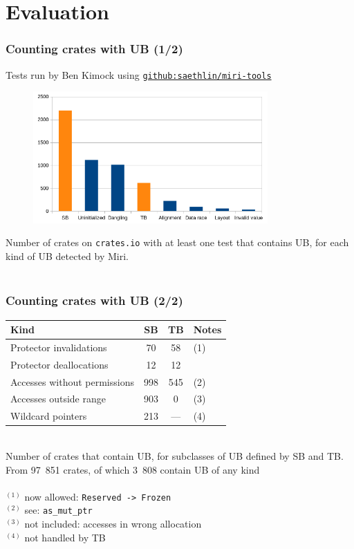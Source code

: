 \section{Evaluation}

\begin{frame}
    \frametitle{Counting crates with UB (1/2)}
    {\footnotesize
    Tests run by Ben Kimock using \href{https://github.com/saethlin/miri-tools}{\texttt{github:saethlin/miri-tools}}\\
    }
    \begin{figure}
        \includegraphics[width=0.8\textwidth]{../img/ub-count.png}
    \end{figure}
    {\footnotesize Number of crates on \texttt{crates.io} with at least one test
    that contains UB, for each kind of UB detected by Miri.}\\~\\
\end{frame}

\begin{frame}
    \frametitle{Counting crates with UB (2/2)}
    \begin{tabular}{|l|c|c|l|}
        \hline
        Kind                         &  SB &  TB & Notes\\
        \hline
        Protector invalidations      &  70 &  58 & \tiny(1) \\
        Protector deallocations      &  12 &  12 & \\
        Accesses without permissions & 998 & 545 & \tiny(2) \\
        Accesses outside range       & 903 &   0 & \tiny(3) \\
        Wildcard pointers            & 213 & --- & \tiny(4) \\
        \hline
    \end{tabular}\\
    Number of crates that contain UB, for subclasses of UB defined by SB and TB.
    From 97~851 crates, of which 3~808 contain UB of any kind~\\~\\

    {\footnotesize
    \(^{(1)}\) now allowed: \texttt{Reserved -> Frozen}\\
    \(^{(2)}\) see: \texttt{as\_mut\_ptr}\\
    \(^{(3)}\) not included: accesses in wrong allocation\\
    \(^{(4)}\) not handled by TB\\
    }
\end{frame}

